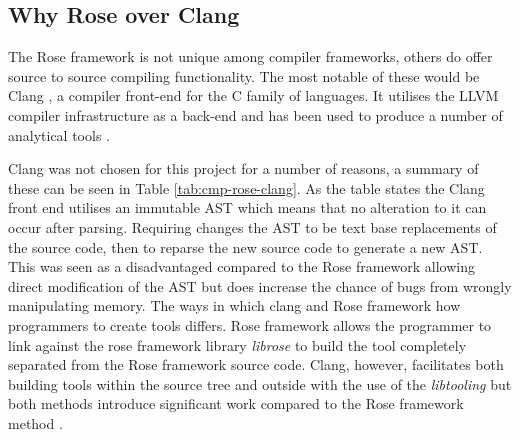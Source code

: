 \documentclass[bsc,frontabs,singlespacing,twoside,parskip,deptreport]{infthesis}
\begin{document}
    
\subsection{Why Rose over Clang}
The Rose framework is not unique among compiler frameworks, others do offer source to source compiling functionality. The most notable of these would be Clang \cite{CLANG}, a compiler front-end for the C family of languages. It utilises the LLVM compiler infrastructure as a back-end and has been used to produce a number of analytical tools \cite{CLANG_TOOLS}. 

Clang was not chosen for this project for a number of reasons, a summary of these can be seen in Table \ref{tab:cmp-rose-clang}. As the table states the Clang front end utilises an immutable AST which means that no alteration to it can occur after parsing. Requiring changes the AST to be text base replacements of the source code, then to reparse the new source code to generate a new AST. This was seen as a disadvantaged compared to the Rose framework allowing direct modification of the AST but does increase the chance of bugs from wrongly manipulating memory. The ways in which clang and Rose framework how programmers to create tools differs. Rose framework allows the programmer to link against the rose framework library \textit{librose} to build the tool completely separated from the Rose framework source code. Clang, however, facilitates both building tools within the source tree and outside with the use of the \textit{libtooling} \cite{CLANG_TOOLS_LIB} but both methods introduce significant work compared to the Rose framework method \cite{ROSE_MAKE}.
\end{document}
